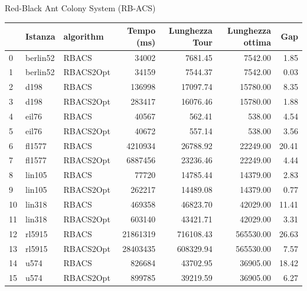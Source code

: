 \documentclass{beamer}
\begin{document}
\begin{frame}{Red-Black Ant Colony System (RB-ACS)}
    \begin{table}[H]
        \centering
        \begin{tabular}{lllrrrr}
            \toprule
               & Istanza  & algorithm & Tempo (ms) & Lunghezza Tour & Lunghezza ottima & Gap   \\
            \midrule
            0  & berlin52 & RBACS     & 34002      & 7681.45        & 7542.00          & 1.85  \\
            1  & berlin52 & RBACS2Opt & 34159      & 7544.37        & 7542.00          & 0.03  \\
            2  & d198     & RBACS     & 136998     & 17097.74       & 15780.00         & 8.35  \\
            3  & d198     & RBACS2Opt & 283417     & 16076.46       & 15780.00         & 1.88  \\
            4  & eil76    & RBACS     & 40567      & 562.41         & 538.00           & 4.54  \\
            5  & eil76    & RBACS2Opt & 40672      & 557.14         & 538.00           & 3.56  \\
            6  & fl1577   & RBACS     & 4210934    & 26788.92       & 22249.00         & 20.41 \\
            7  & fl1577   & RBACS2Opt & 6887456    & 23236.46       & 22249.00         & 4.44  \\
            8  & lin105   & RBACS     & 77720      & 14785.44       & 14379.00         & 2.83  \\
            9  & lin105   & RBACS2Opt & 262217     & 14489.08       & 14379.00         & 0.77  \\
            10 & lin318   & RBACS     & 469358     & 46823.70       & 42029.00         & 11.41 \\
            11 & lin318   & RBACS2Opt & 603140     & 43421.71       & 42029.00         & 3.31  \\
            12 & rl5915   & RBACS     & 21861319   & 716108.43      & 565530.00        & 26.63 \\
            13 & rl5915   & RBACS2Opt & 28403435   & 608329.94      & 565530.00        & 7.57  \\
            14 & u574     & RBACS     & 826684     & 43702.95       & 36905.00         & 18.42 \\
            15 & u574     & RBACS2Opt & 899785     & 39219.59       & 36905.00         & 6.27  \\
            \bottomrule
        \end{tabular}
    \end{table}
\end{frame}
\end{document}
